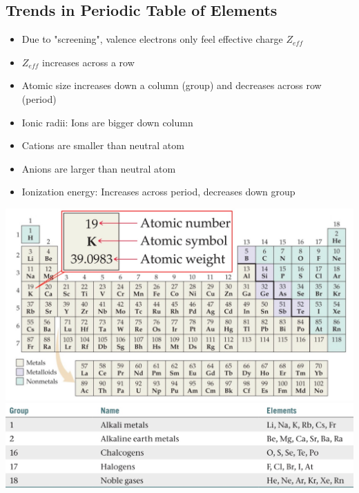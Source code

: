 \subsection{Trends in Periodic Table of Elements}{
\begin{minipage}{0.54\columnwidth}
    \begin{itemize}[leftmargin=0.20cm, itemsep=0.05pt]
        \item Due to "screening", valence electrons only feel effective charge $Z_{eff}$
        \item $Z_{eff}$ increases across a row
        \item Atomic size increases down a column (group) and decreases across row (period)
        \item Ionic radii: Ions are bigger down column
        \item Cations are smaller than neutral atom
        \item Anions are larger than neutral atom
        \item Ionization energy: Increases across period, decreases down group
    \end{itemize}
\end{minipage}
\begin{minipage}{0.45 \columnwidth}
    \begin{center}
        \includegraphics[width = 0.9\linewidth]{images/PSE.jpeg}
        \includegraphics[width = 0.77\linewidth]{images/Groups_PSE.jpeg}
    \end{center}
\end{minipage}
}
